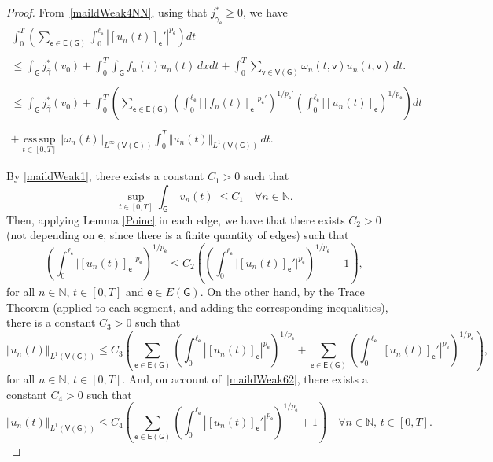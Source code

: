 \documentclass[reqno,12pt]{amsart}
\def\N{\mathbb N} %
\def\e{\mathsf{e}} 	%
\def\v{\mathsf{v}}	%
\newcommand{\G}{\mathsf{G}}	%
\newcommand{\V}{\mathsf{V}}	%
\newcommand{\E}{\mathsf{E}}	%
\numberwithin{equation}{section} %
\begin{document}
\begin{proof}
From~\eqref{maildWeak4NN}, using that $j^*_{\gamma_\e}\ge 0$, we have 
\begin{equation}\label{1245261}
\begin{array}{c}
\displaystyle
\int_0^T \left( \sum_{\e \in\E(\G)}\int_{0}^{\ell_\e}|[u_n(t)]_\e'|^{p_\e}  \right)  dt \\
\\
\displaystyle\leq \int_\G j^*_{\overline{\gamma}}(v_{0})   + \displaystyle  \int_0^T  \int_{\G} f_n (t) u_n(t) \,dxdt + \int_0^T \sum_{\v\in \V(\G)}  \omega_n(t,\v) u_n(t,\v)\, dt.
\\
\\
\displaystyle\leq \int_\G j^*_{\overline{\gamma}}(v_{0}) + \int_0^T   \left(\sum_{\e \in\E(\G)}\left(\int_{0}^{\ell_\e}\vert [f_n(t)]_\e\vert^{p_\e'}\right)^{1/{p_\e'}}  \left(\int_{0}^{\ell_\e}\vert [u_n(t)]_\e\right)^{1/{p_\e}} \right)  dt 
\\
\\
\displaystyle   
 + \operatorname*{ess\,sup}_{t\in[0,T]}
   \Vert \omega_n(t)\Vert_{L^\infty(\V(\G))}   \int_0^T  \Vert u_n(t)  \Vert_{L^1(\V(\G))}\,  dt  .
\end{array}
\end{equation}

  
 By \eqref{maildWeak1}, there exists a constant $C_1 >0$ such that
\begin{equation}\label{maildWeak61}
\sup_{t \in [0,T]}\int_\G \vert v_n(t) \vert \leq C_1\quad \forall n\in \N.
\end{equation} 
Then, applying Lemma \ref{Poinc} in each edge, we have that there exists $C_2>0$ (not depending on $\e$, since there is a finite quantity of edges) such that
\begin{equation}\label{maildWeak62}
\left(\int_{0}^{\ell_\e}\vert [u_n(t)]_\e\vert^{p_\e} \right)^{1/{p_\e}} \leq C_2\left( \left( \int_{0}^{\ell_\e}\vert [u_n(t)]_\e'\vert^{p_\e}\right)^{1/{p_\e}} +1 \right),
\end{equation}
  for all $n \in \N$, $t \in [0,T]$ and $\e \in E(\G)$. 
On the other hand, by the Trace Theorem (applied to each segment, and adding the corresponding inequalities), there is a constant $C_3 >0$     such that
\begin{equation}
 \Vert u_n(t)  \Vert_{L^1(\V(\G))}  \leq C_3\left(\sum_{\e \in\E(\G)}  \left(\int_{0}^{\ell_\e}|[u_n(t)]_\e|^{p_\e}\right)^{1/p_\e}  + \sum_{\e \in\E(\G)}  \left( \int_{0}^{\ell_\e}|[u_n(t)]_\e'|^{p_\e} \right)^{1/p_\e}   \right),
\end{equation}
  for all $n \in \N$, $t \in [0,T]$. 
And, on account of~\eqref{maildWeak62},  there exists a constant $C_4>0$ such that
\begin{equation}\label{maildWeak63}
 \Vert u_n(t)  \Vert_{L^1(\V(\G))}  \leq C_4\left(   \sum_{\e \in\E(\G)}  \left( \int_{0}^{\ell_\e}|[u_n(t)]_\e'|^{p_\e} \right)^{1/p_\e} +1  \right) \quad \forall n \in \N, \, t \in [0,T]. 
\end{equation}


\end{proof}
\end{document}
